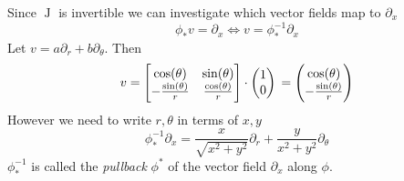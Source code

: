 Since \(\operatorname{J}\) is invertible we can investigate which vector fields map to \(\partial_x\)
%
\begin{equation}
    \phi_* v = \partial_x  \iff v = \phi_{*}^{-1} \partial_x
\end{equation}
%
Let \(v = a \partial_r + b \partial_\theta\).
%
Then
\begin{equation}
    v
    =
    \begin{bmatrix}
        \cos (\theta)            & \sin (\theta)           \\
        -\frac{\sin (\theta)}{r} & \frac{\cos (\theta)}{r} \\
    \end{bmatrix}
    \cdot
    \begin{pmatrix}
        1 \\ 0
    \end{pmatrix} \\
    =
    \begin{pmatrix}
        \cos(\theta) \\ -\frac{\sin (\theta)}{r}
    \end{pmatrix}
\end{equation}
However we need to write \(r, \theta\) in terms of \(x, y\)
\begin{equation}
     \phi_{*}^{-1} \partial_x = \frac{x}{\sqrt{x^2+y^2}}\partial_r + \frac{y}{x^2 + y^2} \partial_\theta
\end{equation}
%
\(\phi_{*}^{-1}\) is called the \textit{pullback} \(\phi^*\) of the vector field \(\partial_x\) along \(\phi\).